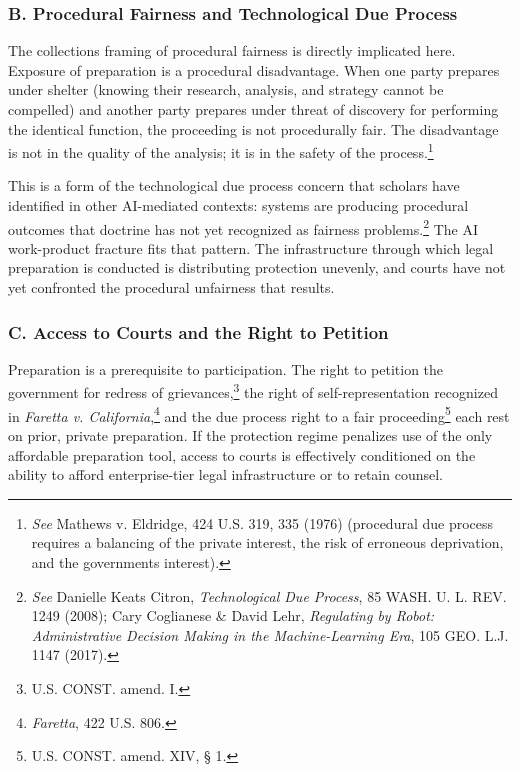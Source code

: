 \documentclass[
  12pt,
]{article}
\begin{document}
\subsubsection{B. Procedural Fairness and Technological Due
Process}\label{b-procedural-fairness-and-technological-due-process}

The collection\textquotesingle s framing of procedural fairness is
directly implicated here. Exposure of preparation is a procedural
disadvantage.
When one party prepares under shelter (knowing their research, analysis,
and strategy cannot be compelled) and another party prepares under
threat of discovery for performing the identical function, the
proceeding is not procedurally fair. The disadvantage is not in the
quality of the analysis; it is in the safety of the process.\footnote{\emph{See}
  Mathews v. Eldridge, 424 U.S. 319, 335 (1976) (procedural due process
  requires a balancing of the private interest, the risk of erroneous
  deprivation, and the government\textquotesingle s interest).}

This is a form of the technological due process concern that scholars
have identified in other AI-mediated contexts: systems are producing
procedural outcomes that doctrine has not yet recognized as fairness
problems.\footnote{\emph{See} Danielle Keats Citron, \emph{Technological
  Due Process}, 85 WASH. U. L. REV. 1249 (2008); Cary Coglianese \&
  David Lehr, \emph{Regulating by Robot: Administrative Decision Making
  in the Machine-Learning Era}, 105 GEO. L.J. 1147 (2017).} The AI
work-product fracture fits that pattern. The infrastructure through
which legal preparation is conducted is distributing protection
unevenly, and courts have not yet confronted the procedural unfairness
that results.

\subsubsection{C. Access to Courts and the Right to
Petition}\label{c-access-to-courts-and-the-right-to-petition}

Preparation is a prerequisite to participation. The right to petition
the government for redress of grievances,\footnote{U.S. CONST. amend. I.}
the right of self-representation recognized in \emph{Faretta v.
California},\footnote{\emph{Faretta}, 422 U.S. 806.} and the due process
right to a fair proceeding\footnote{U.S. CONST. amend. XIV, § 1.} each
rest on prior, private preparation. If the protection regime penalizes
use of the only affordable preparation tool, access to courts is
effectively conditioned on the ability to afford enterprise-tier legal
infrastructure or to retain counsel.
\end{document}
